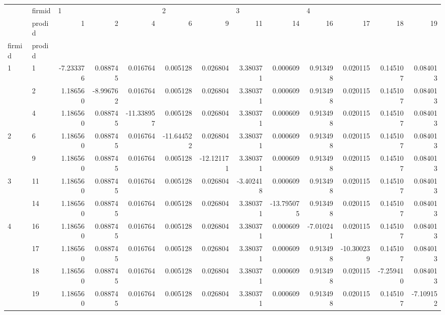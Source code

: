 \begin{tabular}{llrrrrrrrrrrr}
\toprule
  & firmid & \multicolumn{3}{l}{1} & \multicolumn{2}{l}{2} & \multicolumn{2}{l}{3} & \multicolumn{4}{l}{4} \\
  & prodid &        1  &        2  &         4  &         6  &         9  &        11 &         14 &        16 &         17 &        18 &        19 \\
firmid & prodid &           &           &            &            &            &           &            &           &            &           &           \\
\midrule
1 & 1  & -7.233376 &  0.088745 &   0.016764 &   0.005128 &   0.026804 &  3.380371 &   0.000609 &  0.913498 &   0.020115 &  0.145107 &  0.084013 \\
  & 2  &  1.186560 & -8.996762 &   0.016764 &   0.005128 &   0.026804 &  3.380371 &   0.000609 &  0.913498 &   0.020115 &  0.145107 &  0.084013 \\
  & 4  &  1.186560 &  0.088745 & -11.338957 &   0.005128 &   0.026804 &  3.380371 &   0.000609 &  0.913498 &   0.020115 &  0.145107 &  0.084013 \\
2 & 6  &  1.186560 &  0.088745 &   0.016764 & -11.644522 &   0.026804 &  3.380371 &   0.000609 &  0.913498 &   0.020115 &  0.145107 &  0.084013 \\
  & 9  &  1.186560 &  0.088745 &   0.016764 &   0.005128 & -12.121171 &  3.380371 &   0.000609 &  0.913498 &   0.020115 &  0.145107 &  0.084013 \\
3 & 11 &  1.186560 &  0.088745 &   0.016764 &   0.005128 &   0.026804 & -3.402418 &   0.000609 &  0.913498 &   0.020115 &  0.145107 &  0.084013 \\
  & 14 &  1.186560 &  0.088745 &   0.016764 &   0.005128 &   0.026804 &  3.380371 & -13.795075 &  0.913498 &   0.020115 &  0.145107 &  0.084013 \\
4 & 16 &  1.186560 &  0.088745 &   0.016764 &   0.005128 &   0.026804 &  3.380371 &   0.000609 & -7.010241 &   0.020115 &  0.145107 &  0.084013 \\
  & 17 &  1.186560 &  0.088745 &   0.016764 &   0.005128 &   0.026804 &  3.380371 &   0.000609 &  0.913498 & -10.300239 &  0.145107 &  0.084013 \\
  & 18 &  1.186560 &  0.088745 &   0.016764 &   0.005128 &   0.026804 &  3.380371 &   0.000609 &  0.913498 &   0.020115 & -7.259410 &  0.084013 \\
  & 19 &  1.186560 &  0.088745 &   0.016764 &   0.005128 &   0.026804 &  3.380371 &   0.000609 &  0.913498 &   0.020115 &  0.145107 & -7.109152 \\
\bottomrule
\end{tabular}
